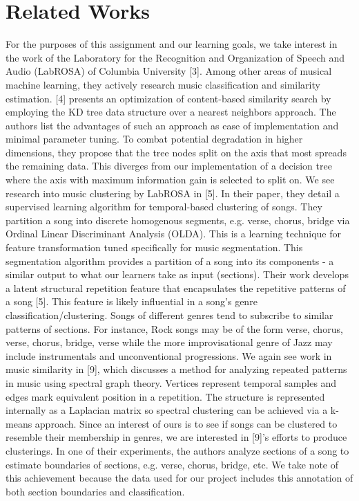 \documentclass[11pt, twocolumn]{article}
\begin{document}
\section{Related Works}
    For the purposes of this assignment and our learning goals, we take interest in the work of the Laboratory for the Recognition and Organization of Speech and Audio (LabROSA) of Columbia University [3]. Among other areas of musical machine learning, they actively research music classification and similarity estimation. [4] presents an optimization of content-based similarity search by employing the KD tree data structure over a nearest neighbors approach. The authors list the advantages of such an approach as ease of implementation and minimal parameter tuning. To combat potential degradation in higher dimensions, they propose that the tree nodes split on the axis that most spreads the remaining data. This diverges from our implementation of a decision tree where the axis with maximum information gain is selected to split on.
    We see research into music clustering by LabROSA in [5]. In their paper, they detail a supervised learning algorithm for temporal-based clustering of songs. They partition a song into discrete homogenous segments, e.g. verse, chorus, bridge via Ordinal Linear Discriminant Analysis (OLDA). This is a learning technique for feature transformation tuned specifically for music segmentation. This segmentation algorithm provides a partition of a song into its components - a similar output to what our learners take as input (sections). Their work develops a latent structural repetition feature that encapsulates the repetitive patterns of a song [5]. This feature is likely influential in a song’s genre classification/clustering. Songs of different genres tend to subscribe to similar patterns of sections. For instance, Rock songs may be of the form verse, chorus, verse, chorus, bridge, verse while the more improvisational genre of Jazz may include instrumentals and unconventional progressions.
    We again see work in music similarity in [9], which discusses a method for analyzing repeated patterns in music using spectral graph theory. Vertices represent temporal samples and edges mark equivalent position in a repetition. The structure is represented internally as a Laplacian matrix so spectral clustering can be achieved via a k-means approach. Since an interest of ours is to see if songs can be clustered to resemble their membership in genres, we are interested in [9]’s efforts to produce clusterings. In one of their experiments, the authors analyze sections of a song to estimate boundaries of sections, e.g. verse, chorus, bridge, etc. We take note of this achievement because the data used for our project includes this annotation of both section boundaries and classification.
\end{document}
